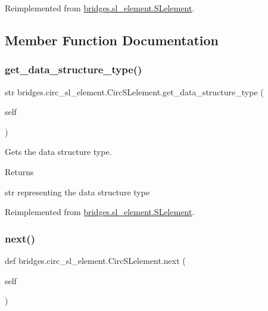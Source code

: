 Reimplemented from \mbox{\hyperlink{classbridges_1_1sl__element_1_1_s_lelement_a0824caaa305931953bf3f6d53d3a3d14}{bridges.\+sl\+\_\+element.\+S\+Lelement}}.



\subsection{Member Function Documentation}
\mbox{\label{classbridges_1_1circ__sl__element_1_1_circ_s_lelement_a417f0fa7de0f4d1017ca7a27870c45d3}} 
\subsubsection{\texorpdfstring{get\_data\_structure\_type()}{get\_data\_structure\_type()}}
{\footnotesize\ttfamily  str bridges.\+circ\+\_\+sl\+\_\+element.\+Circ\+S\+Lelement.\+get\+\_\+data\+\_\+structure\+\_\+type (\begin{DoxyParamCaption}\item[{}]{self }\end{DoxyParamCaption})}



Gets the data structure type. 

\begin{DoxyReturn}{Returns}


str representing the data structure type 
\end{DoxyReturn}


Reimplemented from \mbox{\hyperlink{classbridges_1_1sl__element_1_1_s_lelement_ae6d1c0479d0ed763e1ea54f5d2f9a0eb}{bridges.\+sl\+\_\+element.\+S\+Lelement}}.

\mbox{\label{classbridges_1_1circ__sl__element_1_1_circ_s_lelement_a5abc123aa4a20414a02785f3b1cc342a}} 
\subsubsection{\texorpdfstring{next()}{next()}\hspace{0.1cm}{\footnotesize\ttfamily [1/2]}}
{\footnotesize\ttfamily def bridges.\+circ\+\_\+sl\+\_\+element.\+Circ\+S\+Lelement.\+next (\begin{DoxyParamCaption}\item[{}]{self }\end{DoxyParamCaption})}



